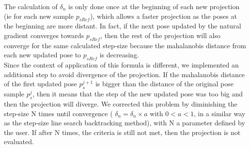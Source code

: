 \documentclass[letterpaper, 10 pt, conference]{ieeeconf}  %
\begin{document}
The calculation of $\delta_{n}$ is only done once at the beginning of each new projection (ie for each new sample $p_{sRef}$), which allows a faster projection as the poses at the beginning are more distant. In fact, if the next pose updated by the natural gradient converges towards $p_{sRef}$, then the rest of the projection will also converge for the same calculated step-size because the mahalanobis distance from each new updated pose to  $p_{sRef}$ is decreasing.\\
Since the context of application of this formula is different, we implemented an additional step to avoid divergence of the projection. If the mahalanobis distance of the first updated pose $p_s^{j+1}$ is bigger than the distance of the original pose sample $p_s^{j}$, then it means that the step of the new updated pose was too big and then the projection will diverge. We corrected this problem by diminishing the step-size N times until convergence ( $\delta_{n}= \delta_{n} \times a$ with $0<a<1$, in a similar way as the step-size line search backtracking method), with N a parameter defined by the user. If after N times, the criteria is still not met, then the projection is not evaluated.
\end{document}
